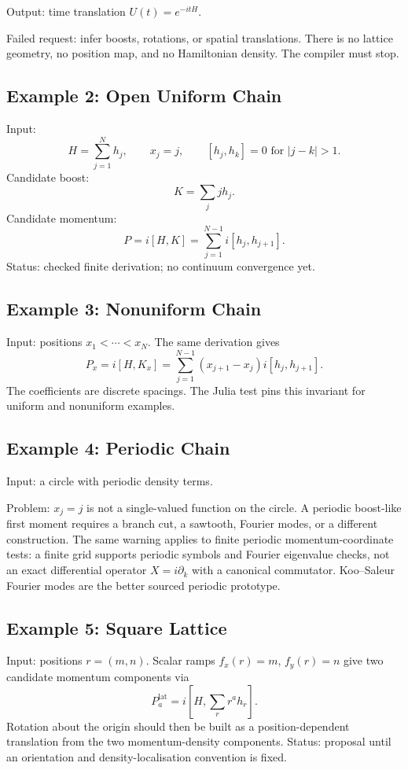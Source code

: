 Output: time translation \(U(t)=e^{-itH}\).

Failed request: infer boosts, rotations, or spatial translations.  There is no
lattice geometry, no position map, and no Hamiltonian density.  The compiler
must stop.

\subsection{Example 2: Open Uniform Chain}

Input:
\[
  H=\sum_{j=1}^N h_j,\qquad x_j=j,\qquad [h_j,h_k]=0\text{ for }|j-k|>1.
\]
Candidate boost:
\[
  K=\sum_j jh_j.
\]
Candidate momentum:
\[
  P=i[H,K]=\sum_{j=1}^{N-1}i[h_j,h_{j+1}].
\]
Status: checked finite derivation; no continuum convergence yet.

\subsection{Example 3: Nonuniform Chain}

Input: positions \(x_1<\cdots<x_N\).  The same derivation gives
\[
  P_x=i[H,K_x]
  =
  \sum_{j=1}^{N-1}(x_{j+1}-x_j)i[h_j,h_{j+1}].
\]
The coefficients are discrete spacings.  The Julia test pins this invariant for
uniform and nonuniform examples.

\subsection{Example 4: Periodic Chain}

Input: a circle with periodic density terms.

Problem: \(x_j=j\) is not a single-valued function on the circle.  A periodic
boost-like first moment requires a branch cut, a sawtooth, Fourier modes, or a
different construction.  The same warning applies to finite periodic
momentum-coordinate tests: a finite grid supports periodic symbols and Fourier
eigenvalue checks, not an exact differential operator \(X=i\partial_k\) with a
canonical commutator.  Koo--Saleur Fourier modes are the better sourced
periodic prototype.

\subsection{Example 5: Square Lattice}

Input: positions \(r=(m,n)\).  Scalar ramps \(f_x(r)=m\), \(f_y(r)=n\) give two
candidate momentum components via
\[
  P_a^{\mathrm{lat}}=i[H,\sum_r r^a h_r].
\]
Rotation about the origin should then be built as a position-dependent
translation from the two momentum-density components.  Status: proposal until an
orientation and density-localisation convention is fixed.

